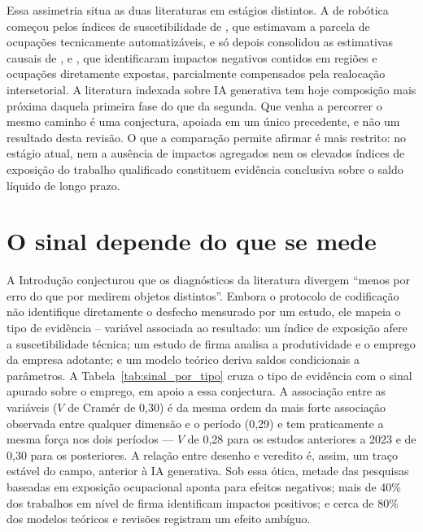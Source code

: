 Essa assimetria situa as duas literaturas em estágios distintos. A de robótica começou pelos índices de suscetibilidade de \textcite{frey2017}, que estimavam a parcela de ocupações tecnicamente automatizáveis, e só depois consolidou as estimativas causais de \textcite{acemogluRestrepo2020robots}, \textcite{graetzMichaels2018} e \textcite{dauth2021}, que identificaram impactos negativos contidos em regiões e ocupações diretamente expostas, parcialmente compensados pela realocação intersetorial. A literatura indexada sobre IA generativa tem hoje composição mais próxima daquela primeira fase do que da segunda. Que venha a percorrer o mesmo caminho é uma conjectura, apoiada em um único precedente, e não um resultado desta revisão. O que a comparação permite afirmar é mais restrito: no estágio atual, nem a ausência de impactos agregados nem os elevados índices de exposição do trabalho qualificado constituem evidência conclusiva sobre o saldo líquido de longo prazo.

\section{O sinal depende do que se mede}

A Introdução conjecturou que os diagnósticos da literatura divergem ``menos por erro do que por medirem objetos distintos''. Embora o protocolo de codificação não identifique diretamente o desfecho mensurado por um  estudo, ele mapeia o tipo de evidência -- variável associada ao resultado: um índice de exposição afere a suscetibilidade técnica; um estudo de firma analisa a produtividade e o emprego da empresa adotante; e um modelo teórico deriva saldos condicionais a parâmetros. A Tabela~\ref{tab:sinal_por_tipo} cruza o tipo de evidência com o sinal apurado sobre o emprego, em apoio a essa conjectura. A associação entre as variáveis ($V$ de Cramér de 0,30) é da mesma ordem da mais forte associação observada entre qualquer dimensão e o período (0,29) e tem praticamente a mesma força nos dois períodos — $V$ de 0,28 para os estudos anteriores a 2023 e de 0,30 para os posteriores. A relação entre desenho e veredito é, assim, um traço estável do campo, anterior à IA generativa. Sob essa ótica, metade das pesquisas baseadas em exposição ocupacional aponta para efeitos negativos; mais de 40\% dos trabalhos em nível de firma identificam impactos positivos; e cerca de 80\% dos modelos teóricos e revisões registram um efeito ambíguo.

\begin{table}[htbp]
\centering
\caption{Sinal sobre o emprego segundo o tipo de evidência.}
\label{tab:sinal_por_tipo}

\end{table}

